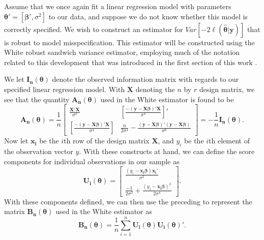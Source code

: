 \documentclass[review]{elsarticle}
\begin{document}
		Assume that we once again fit a linear regression model with parameters $\bm{\theta}' = [\bm{\beta}', \sigma^2]$ to our data, and suppose we do not know whether this model is correctly specified.
		We wish to construct an estimator for $Var \left[ -2 \ell (\hat{\bm{\theta}} | \bm{y} ) \right]$ that is robust to model misspecification. This estimator will be constructed using the White robust
		sandwich variance estimator, employing much of the notation related to this development that was introduced in the first section of this work \citep{White1980}.

		We let $\bm{I_{n}} (\bm{\theta})$ denote the observed information matrix with regards to our specified linear regression model. With $\bm{X}$ denoting the $n$ by $r$ design matrix, we see that
		the quantity $\bm{A_n} (\bm{\theta})$ used in the White estimator is found to be 
		\begin{equation*}
			\bm{A_n}(\bm{\theta}) = \frac{1}{n}
			\begin{bmatrix}
				\frac{\bm{X}'\bm{X}}{\sigma^2} & \left[ \frac{-(\bm{y}-\bm{X}\bm{\beta})'\bm{X}}{\sigma^4} \right]' \\
				\left[ \frac{-(\bm{y}-\bm{X}\bm{\beta})'\bm{X}}{\sigma^4} \right] &  \frac{n}{2 \sigma^4} - \frac{(\bm{y}-\bm{X}\bm{\beta})'(\bm{y}-\bm{X}\bm{\beta})}{\sigma^6}
				\end{bmatrix}
				= -\frac{1}{n} \bm{I_n}(\bm{\theta}) .
		\end{equation*}
		Now let $\bm{x_i}$ be the $i$th row of the design matrix $\bm{X}$, and $y_i$ be the $i$th element of the observation vector $y$. With these constructs at hand, we can define the score components
		for individual observations in our sample as
		\begin{equation*}
			\bm{U_i}(\bm{\theta}) = 
			\begin{bmatrix}
				\frac{(y_i-\bm{x_i} \bm{\beta})\bm{x_i}'}{\sigma^2} \\
				\frac{-1}{2 \sigma^2} + \frac{(y_i - \bm{x_i} \bm{\beta})^2}{2 \sigma^4}
			\end{bmatrix}
			.
		\end{equation*}
		With these components defined, we can then use the preceding to represent the matrix $\bm{B_n} (\bm{\theta})$ used in the White estimator as
		\begin{equation*}
			\bm{B_n}(\bm{\theta}) = \frac{1}{n} \sum_{i=1}^{n} \bm{U_i}(\bm{\theta}) \bm{U_i}(\bm{\theta})' .
		\end{equation*}
\end{document}
